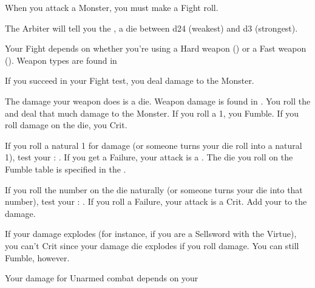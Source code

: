 {  



  When you attack a Monster, you must make a Fight roll.


  The Arbiter will tell you the , a \STATIC die between d24 (weakest) and d3 (strongest).

  Your Fight \RO depends on whether you're using a Hard weapon (\VIG) or a Fast weapon (\DEX).  Weapon types are found in 

  If you succeed in your Fight \RO test, you deal damage to the Monster.


  The damage your weapon does is a \STATIC die.  Weapon damage is found in .  You roll the \STATIC and deal that much damage to the Monster.  If you roll a 1, you Fumble.  If you roll \MAX damage on the die, you Crit.


  If you roll a natural 1 for damage (or someone turns your die roll into a natural 1), test your  \RS : \FOC.  If you get a Failure, your attack is a .  The die you roll on the Fumble table is specified in the .

  If you roll the \MAX number on the die naturally (or someone turns your die into that \MAX number), test your \RS : \FOC.  If you  roll a Failure, your attack is a Crit.  Add your \LVL to the damage.


  If your damage explodes (for instance, if you are a Sellsword with the  Virtue), you can't Crit since your damage die explodes if you roll \MAX damage.  You can still Fumble, however.



  Your damage for Unarmed combat depends on your \VIG


}
